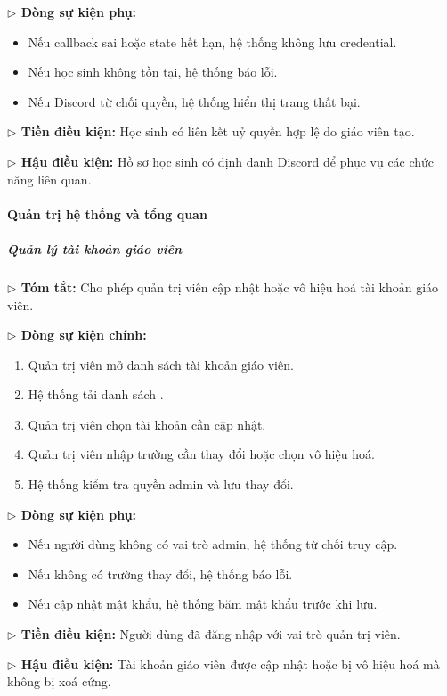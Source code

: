 \documentclass[12pt,a4paper]{article}
\newcommand{\code}[1]{{\ttfamily\seqsplit{#1}}}
\begin{document}
\textbf{$\triangleright$ Dòng sự kiện phụ:}
\begin{itemize}[leftmargin=*]
\item Nếu callback sai hoặc state hết hạn, hệ thống không lưu credential.
\item Nếu học sinh không tồn tại, hệ thống báo lỗi.
\item Nếu Discord từ chối quyền, hệ thống hiển thị trang thất bại.
\end{itemize}

\textbf{$\triangleright$ Tiền điều kiện:} Học sinh có liên kết uỷ quyền hợp lệ do giáo viên tạo.

\textbf{$\triangleright$ Hậu điều kiện:} Hồ sơ học sinh có định danh Discord để phục vụ các chức năng liên quan.

\paragraph{Quản trị hệ thống và tổng quan}

\subparagraph{Quản lý tài khoản giáo viên}
\textbf{$\triangleright$ Tóm tắt:} Cho phép quản trị viên cập nhật hoặc vô hiệu hoá tài khoản giáo viên.

\textbf{$\triangleright$ Dòng sự kiện chính:}
\begin{enumerate}[leftmargin=*]
\item Quản trị viên mở danh sách tài khoản giáo viên.
\item Hệ thống tải danh sách \code{Teacher}.
\item Quản trị viên chọn tài khoản cần cập nhật.
\item Quản trị viên nhập trường cần thay đổi hoặc chọn vô hiệu hoá.
\item Hệ thống kiểm tra quyền admin và lưu thay đổi.
\end{enumerate}

\textbf{$\triangleright$ Dòng sự kiện phụ:}
\begin{itemize}[leftmargin=*]
\item Nếu người dùng không có vai trò admin, hệ thống từ chối truy cập.
\item Nếu không có trường thay đổi, hệ thống báo lỗi.
\item Nếu cập nhật mật khẩu, hệ thống băm mật khẩu trước khi lưu.
\end{itemize}

\textbf{$\triangleright$ Tiền điều kiện:} Người dùng đã đăng nhập với vai trò quản trị viên.

\textbf{$\triangleright$ Hậu điều kiện:} Tài khoản giáo viên được cập nhật hoặc bị vô hiệu hoá mà không bị xoá cứng.
\end{document}
